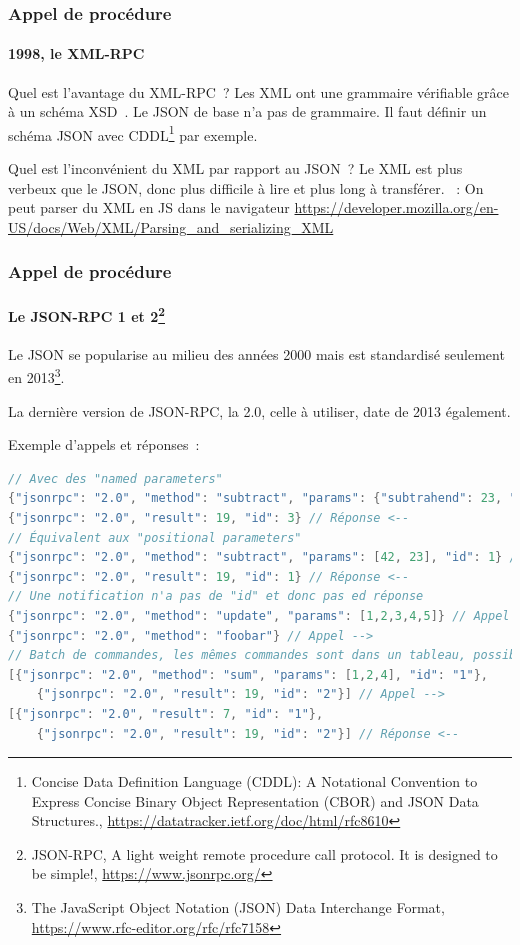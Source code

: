 \documentclass{beamer}
\begin{document}
    \begin{frame}
        \transdissolve
        \frametitle{Appel de procédure}
        \framesubtitle{1998, le XML-RPC}
        Quel est l'avantage du XML-RPC~?
        \pause
        \bigbreak
        Les XML ont une grammaire vérifiable grâce à un schéma XSD~.
        Le JSON de base n'a pas de grammaire.
        Il faut définir un schéma JSON avec CDDL\footnote{Concise Data Definition Language (CDDL): A Notational Convention to Express Concise Binary Object Representation (CBOR) and JSON Data Structures., \url{https://datatracker.ietf.org/doc/html/rfc8610}} par exemple.

        Quel est l'inconvénient du XML par rapport au JSON~?
        \pause
        \bigbreak
        Le XML est plus verbeux que le JSON, donc plus difficile à lire et plus long à transférer.
        \bigbreak
        ~: On peut parser du XML en JS dans le navigateur \url{https://developer.mozilla.org/en-US/docs/Web/XML/Parsing_and_serializing_XML}
    \end{frame}

    \begin{frame}[fragile]
        \transdissolve
        \frametitle{Appel de procédure}
        \framesubtitle{Le JSON-RPC 1 et 2\footnote{JSON-RPC, A light weight remote procedure call protocol. It is designed to be simple!, \url{https://www.jsonrpc.org/}}}
        Le JSON se popularise au milieu des années 2000 mais est standardisé seulement en 2013\footnote{The JavaScript Object Notation (JSON) Data Interchange Format, \url{https://www.rfc-editor.org/rfc/rfc7158}}.

        La dernière version de JSON-RPC, la 2.0, celle à utiliser, date de 2013 également.

        Exemple d'appels et réponses~:
        \begin{lstlisting}[language=java,basicstyle=\ttfamily\tiny]
// Avec des "named parameters"
{"jsonrpc": "2.0", "method": "subtract", "params": {"subtrahend": 23, "minuend": 42}, "id": 3} // Appel -->
{"jsonrpc": "2.0", "result": 19, "id": 3} // Réponse <--
// Équivalent aux "positional parameters"
{"jsonrpc": "2.0", "method": "subtract", "params": [42, 23], "id": 1} // Appel -->
{"jsonrpc": "2.0", "result": 19, "id": 1} // Réponse <--
// Une notification n'a pas de "id" et donc pas ed réponse
{"jsonrpc": "2.0", "method": "update", "params": [1,2,3,4,5]} // Appel -->
{"jsonrpc": "2.0", "method": "foobar"} // Appel -->
// Batch de commandes, les mêmes commandes sont dans un tableau, possible pour les notifications également
[{"jsonrpc": "2.0", "method": "sum", "params": [1,2,4], "id": "1"},
    {"jsonrpc": "2.0", "result": 19, "id": "2"}] // Appel -->
[{"jsonrpc": "2.0", "result": 7, "id": "1"},
    {"jsonrpc": "2.0", "result": 19, "id": "2"}] // Réponse <--
        \end{lstlisting}
    \end{frame}
\end{document}
